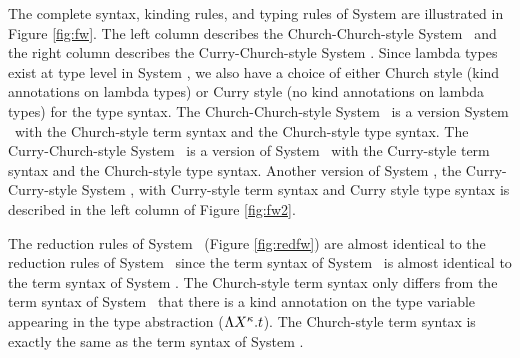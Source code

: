 
The complete syntax, kinding rules, and typing rules of System \Fw
are illustrated in Figure \ref{fig:fw}. The left column describes
the Church-Church-style System \F\ and the right column describes
the Curry-Church-style System \F. Since lambda types exist at type level
in System \Fw, we also have a choice of either Church style (kind annotations
on lambda types) or Curry style (no kind annotations on lambda types) for
the type syntax. The Church-Church-style System \Fw\ is a version System \Fw\ 
with the Church-style term syntax and the Church-style type syntax.
The Curry-Church-style System \Fw\ is a version of System \Fw\ 
with the Curry-style term syntax and the Church-style type syntax.
Another version of System \Fw, the Curry-Curry-style System \Fw,
with Curry-style term syntax and Curry style type syntax is described
in the left column of Figure \ref{fig:fw2}.

The reduction rules of System \Fw\ (Figure \ref{fig:redfw}) are
almost identical to the reduction rules of System \F\ since the term syntax of
System \Fw\ is almost identical to the term syntax of System \F.
The Church-style term syntax only differs from the term syntax of System \F\ 
that there is a kind annotation on the type variable appearing in
the type abstraction ($\Lambda X^\kappa.t$). The Church-style term syntax is
exactly the same as the term syntax of System \F.

